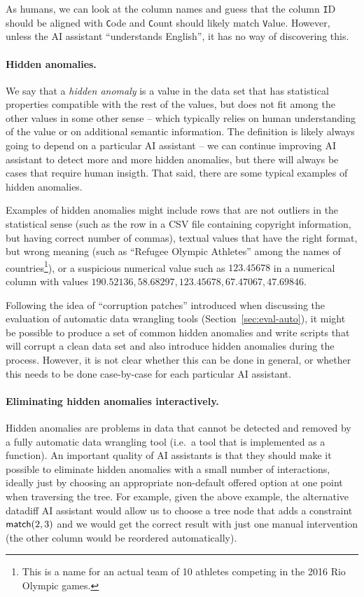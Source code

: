 \documentclass{article}
\begin{document}
\noindent
As humans, we can look at the column names and guess that the column {\texttt ID} should be 
aligned with {\texttt Code} and {\texttt Count} should likely match {\texttt Value}. However, 
unless the AI assistant ``understands English'', it has no way of discovering this. 

\paragraph{Hidden anomalies.}
We say that a \emph{hidden anomaly} is a value in the data set that has statistical properties
compatible with the rest of the values, but does not fit among the other values in some other
sense -- which typically relies on human understanding of the value or on additional semantic
information. The definition is likely always going to depend on a particular AI assistant -- we
can continue improving AI assistant to detect more and more hidden anomalies, but there will always
be cases that require human insigth. That said, there are some typical examples of hidden anomalies.

Examples of hidden anomalies might include rows that are not outliers in the statistical sense
(such as the row in a CSV file containing copyright information, but having correct number of commas), 
textual values that have the right format, but wrong meaning (such as ``Refugee Olympic Athletes'' 
among the names of countries\footnote{This is a name for an actual team of 10 athletes competing 
in the 2016 Rio Olympic games.}), or a suspicious numerical value such as $123.45678$ in a numerical 
column with values $190.52136, 58.68297, 123.45678, 67.47067, 47.69846$.

Following the idea of ``corruption patches'' introduced when discussing the evaluation of automatic
data wrangling tools (Section~\ref{sec:eval-auto}), it might be possible to produce a set of common
hidden anomalies and write scripts that will corrupt a clean data set and also introduce hidden 
anomalies during the process. However, it is not clear whether this can be done in general, or
whether this needs to be done case-by-case for each particular AI assistant.

\paragraph{Eliminating hidden anomalies interactively.}
Hidden anomalies are problems in data that cannot be detected and removed by a fully automatic
data wrangling tool (i.e.~a tool that is implemented as a function). An important quality of AI 
assistants is that they should make it possible to eliminate hidden anomalies with a small 
number of interactions, ideally just by choosing an appropriate non-default offered option at one 
point when traversing the tree. For example, given the above example, the alternative datadiff AI 
assistant would allow us to choose a tree node that adds a constraint $\textnormal{\sffamily match}(2,3)$ and 
we would get the correct result with just one manual intervention (the other column would be 
reordered automatically).
\end{document}
